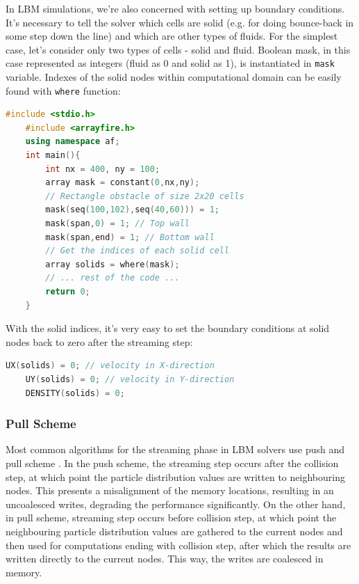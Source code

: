 In LBM simulations, we're also concerned with setting up boundary conditions. It's necessary to tell the solver which cells are solid (e.g. for doing bounce-back in some step down the line) and which are other types of fluids. For the simplest case, let's consider only two types of cells - solid and fluid. Boolean mask, in this case represented as integers (fluid as 0 and solid as 1), is instantiated in \texttt{mask} variable. Indexes of the solid nodes within computational domain can be easily found with \texttt{where} function:

\begin{lstlisting}[language=Cpp, caption=C++ code for constructiong the index of all solid cells using ArrayFire.]
	#include <stdio.h>
	#include <arrayfire.h>
	using namespace af;
	int main(){
		int nx = 400, ny = 100;
		array mask = constant(0,nx,ny);
		// Rectangle obstacle of size 2x20 cells
		mask(seq(100,102),seq(40,60))) = 1;
		mask(span,0) = 1; // Top wall
		mask(span,end) = 1; // Bottom wall
		// Get the indices of each solid cell
		array solids = where(mask);
		// ... rest of the code ...
		return 0;
	}
\end{lstlisting}

With the solid indices, it's very easy to set the boundary conditions at solid nodes back to zero after the streaming step:

\begin{lstlisting}[language=Cpp, caption=Boundary conditions at solid nodes.]
	UX(solids) = 0; // velocity in X-direction
	UY(solids) = 0; // velocity in Y-direction
	DENSITY(solids) = 0;
\end{lstlisting}

\subsubsection{Pull Scheme}

Most common algorithms for the streaming phase in LBM solvers use push and pull scheme \cite{tranPerformanceOptimization3D2017, herschlagGPUDataAccess2018}. In the push scheme, the streaming step occurs after the collision step, at which point the particle distribution values are written to neighbouring nodes. This presents a misalignment of the memory locations, resulting in an uncoalesced writes, degrading the performance significantly. On the other hand, in pull scheme, streaming step occurs before collision step, at which point the neighbouring particle distribution values are gathered to the current nodes and then used for computations ending with collision step, after which the results are written directly to the current nodes. This way, the writes are coalesced in memory.

